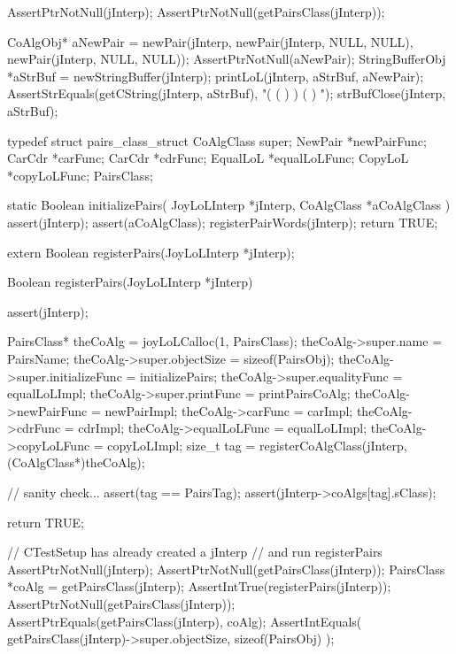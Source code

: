 
\startCTest
  AssertPtrNotNull(jInterp);
  AssertPtrNotNull(getPairsClass(jInterp));

  CoAlgObj* aNewPair = newPair(jInterp,
                               newPair(jInterp, NULL, NULL),
                               newPair(jInterp, NULL, NULL));
  AssertPtrNotNull(aNewPair);
  StringBufferObj *aStrBuf = newStringBuffer(jInterp);
  printLoL(jInterp, aStrBuf, aNewPair);
  AssertStrEquals(getCString(jInterp, aStrBuf), "( ( ) ) ( ) ");
  strBufClose(jInterp, aStrBuf);
\stopCTest
\stopTestCase
\stopTestSuite

\startTestSuite[registerPairs]

\startCHeader
typedef struct pairs_class_struct {
  CoAlgClass  super;
  NewPair    *newPairFunc;
  CarCdr     *carFunc;
  CarCdr     *cdrFunc;
  EqualLoL   *equalLoLFunc;
  CopyLoL    *copyLoLFunc;
} PairsClass;
\stopCHeader

\startCCode
static Boolean initializePairs(
  JoyLoLInterp *jInterp,
  CoAlgClass   *aCoAlgClass
) {
  assert(jInterp);
  assert(aCoAlgClass);
  registerPairWords(jInterp);
  return TRUE;
}
\stopCCode

\startCHeader
extern Boolean registerPairs(JoyLoLInterp *jInterp);
\stopCHeader
{}

\startCCode
Boolean registerPairs(JoyLoLInterp *jInterp) {
  assert(jInterp);
  
  PairsClass* theCoAlg           = joyLoLCalloc(1, PairsClass);
  theCoAlg->super.name           = PairsName;
  theCoAlg->super.objectSize     = sizeof(PairsObj);
  theCoAlg->super.initializeFunc = initializePairs;
  theCoAlg->super.equalityFunc   = equalLoLImpl;
  theCoAlg->super.printFunc      = printPairsCoAlg;
  theCoAlg->newPairFunc          = newPairImpl;
  theCoAlg->carFunc              = carImpl;
  theCoAlg->cdrFunc              = cdrImpl;
  theCoAlg->equalLoLFunc         = equalLoLImpl;
  theCoAlg->copyLoLFunc          = copyLoLImpl;
  size_t tag =
    registerCoAlgClass(jInterp, (CoAlgClass*)theCoAlg);
  
  // sanity check...
  assert(tag == PairsTag);
  assert(jInterp->coAlgs[tag].sClass);

  return TRUE;
}
\stopCCode


\startCTest
  // CTestSetup has already created a jInterp
  // and run registerPairs
  AssertPtrNotNull(jInterp);
  AssertPtrNotNull(getPairsClass(jInterp));
  PairsClass *coAlg = getPairsClass(jInterp);
  AssertIntTrue(registerPairs(jInterp));
  AssertPtrNotNull(getPairsClass(jInterp));
  AssertPtrEquals(getPairsClass(jInterp), coAlg);
  AssertIntEquals(
    getPairsClass(jInterp)->super.objectSize,
    sizeof(PairsObj)
  );
\stopCTest
\stopTestCase
\stopTestSuite

